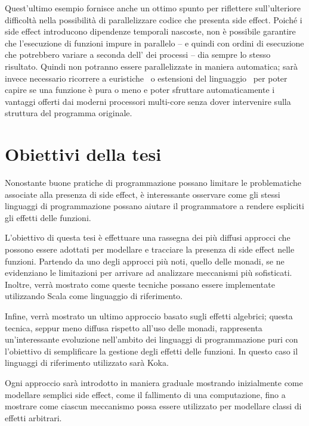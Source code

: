 


Quest'ultimo esempio fornisce anche un ottimo spunto per riflettere sull'ulteriore difficoltà nella possibilità di parallelizzare codice che presenta side effect.
Poiché i side effect introducono dipendenze temporali nascoste, non è possibile garantire che l'esecuzione di funzioni impure in parallelo -- e quindi con ordini di esecuzione che potrebbero variare a seconda dell' dei processi -- dia sempre lo stesso risultato.
Quindi non potranno essere parallelizzate in maniera automatica; sarà invece necessario ricorrere a euristiche~\cite{cit:safe-automated-refactoring-for-intelligent-parallelization-of-java-8-streams} o estensioni del linguaggio~\cite{cit:pure-functions-in-c-a-small-keyword-for-automatic-parallelization} per poter capire se una funzione è pura o meno e poter sfruttare automaticamente i vantaggi offerti dai moderni processori multi-core senza dover intervenire sulla struttura del programma originale.

\section*{Obiettivi della tesi}
Nonostante buone pratiche di programmazione possano limitare le problematiche associate alla presenza di side effect, è interessante osservare come gli stessi linguaggi di programmazione possano aiutare il programmatore a rendere espliciti gli effetti delle funzioni.

L'obiettivo di questa tesi è effettuare una rassegna dei più diffusi approcci che possono essere adottati per modellare e tracciare la presenza di side effect nelle funzioni.
Partendo da uno degli approcci più noti, quello delle monadi, se ne evidenziano le limitazioni per arrivare ad analizzare meccanismi più sofisticati.
Inoltre, verrà mostrato come queste tecniche possano essere implementate utilizzando Scala come linguaggio di riferimento.

Infine, verrà mostrato un ultimo approccio basato sugli effetti algebrici; questa tecnica, seppur meno diffusa rispetto all'uso delle monadi, rappresenta un'interessante evoluzione nell'ambito dei linguaggi di programmazione puri con l'obiettivo di semplificare la gestione degli effetti delle funzioni.
In questo caso il linguaggi di riferimento utilizzato sarà Koka.

Ogni approccio sarà introdotto in maniera graduale mostrando inizialmente come modellare semplici side effect, come il fallimento di una computazione, fino a mostrare come ciascun meccanismo possa essere utilizzato per modellare classi di effetti arbitrari.
